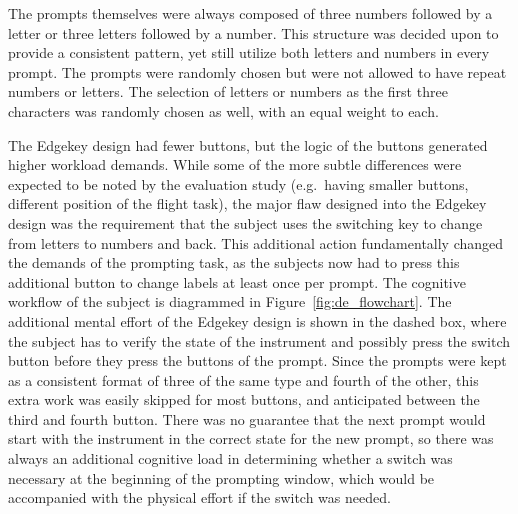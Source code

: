 The prompts themselves were always composed of three numbers followed by a letter or three letters followed by a number.
This structure was decided upon to provide a consistent pattern, yet still utilize both letters and numbers in every prompt.
The prompts were randomly chosen but were not allowed to have repeat numbers or letters. %
The selection of letters or numbers as the first three characters was randomly chosen as well, with an equal weight to each.

The Edgekey design had fewer buttons, but the logic of the buttons generated higher workload demands.
While some of the more subtle differences were expected to be noted by the evaluation study (e.g.\ having smaller buttons, different position of the flight task), the major flaw designed into the Edgekey design was the requirement that the subject uses the switching key to change from letters to numbers and back.
This additional action fundamentally changed the demands of the prompting task, as the subjects now had to press this additional button to change labels at least once per prompt.
The cognitive workflow of the subject is diagrammed in Figure~\ref{fig:de_flowchart}.
The additional mental effort of the Edgekey design is shown in the dashed box, where the subject has to verify the state of the instrument and possibly press the switch button before they press the buttons of the prompt.
Since the prompts were kept as a consistent format of three of the same type and fourth of the other, this extra work was easily skipped for most buttons, and anticipated between the third and fourth button.
There was no guarantee that the next prompt would start with the instrument in the correct state for the new prompt, so there was always an additional cognitive load in determining whether a switch was necessary at the beginning of the prompting window, which would be accompanied with the physical effort if the switch was needed.

